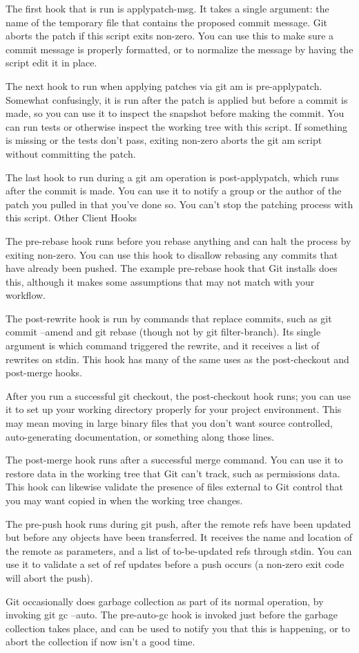 The first hook that is run is applypatch-msg. It takes a single argument: the name of the temporary file that contains the proposed commit message. Git aborts the patch if this script exits non-zero. You can use this to make sure a commit message is properly formatted, or to normalize the message by having the script edit it in place.

The next hook to run when applying patches via git am is pre-applypatch. Somewhat confusingly, it is run after the patch is applied but before a commit is made, so you can use it to inspect the snapshot before making the commit. You can run tests or otherwise inspect the working tree with this script. If something is missing or the tests don’t pass, exiting non-zero aborts the git am script without committing the patch.

The last hook to run during a git am operation is post-applypatch, which runs after the commit is made. You can use it to notify a group or the author of the patch you pulled in that you’ve done so. You can’t stop the patching process with this script.
Other Client Hooks

The pre-rebase hook runs before you rebase anything and can halt the process by exiting non-zero. You can use this hook to disallow rebasing any commits that have already been pushed. The example pre-rebase hook that Git installs does this, although it makes some assumptions that may not match with your workflow.

The post-rewrite hook is run by commands that replace commits, such as git commit --amend and git rebase (though not by git filter-branch). Its single argument is which command triggered the rewrite, and it receives a list of rewrites on stdin. This hook has many of the same uses as the post-checkout and post-merge hooks.

After you run a successful git checkout, the post-checkout hook runs; you can use it to set up your working directory properly for your project environment. This may mean moving in large binary files that you don’t want source controlled, auto-generating documentation, or something along those lines.

The post-merge hook runs after a successful merge command. You can use it to restore data in the working tree that Git can’t track, such as permissions data. This hook can likewise validate the presence of files external to Git control that you may want copied in when the working tree changes.

The pre-push hook runs during git push, after the remote refs have been updated but before any objects have been transferred. It receives the name and location of the remote as parameters, and a list of to-be-updated refs through stdin. You can use it to validate a set of ref updates before a push occurs (a non-zero exit code will abort the push).

Git occasionally does garbage collection as part of its normal operation, by invoking git gc --auto. The pre-auto-gc hook is invoked just before the garbage collection takes place, and can be used to notify you that this is happening, or to abort the collection if now isn’t a good time.
